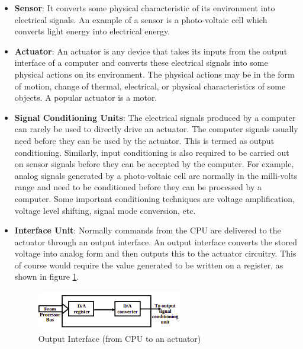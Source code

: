 \documentclass[12pt]{report}
\begin{document}
\begin{itemize}
    \item \textbf{Sensor}: It converts some physical characteristic of its environment into electrical signals. An example of a sensor is a photo-voltaic cell which converts light energy into electrical energy.
    \item \textbf{Actuator}: An actuator is any device that takes its inputs from the output interface of a computer and converts these electrical signals into some physical actions on its environment. The physical actions may be in the form of motion, change of thermal, electrical, or physical characteristics of some objects. A popular actuator is a motor.
    \item \textbf{Signal Conditioning Units}: The electrical signals produced by a computer can rarely be used to directly drive an actuator. The computer signals usually need before they can be used by the actuator. This is termed as output conditioning. Similarly, input conditioning is also required to be carried out on sensor signals before they can be accepted by the computer. For example, analog signals generated by a photo-voltaic cell are normally in the milli-volts range and need to be conditioned before they can be processed by a computer. Some important conditioning techniques are voltage amplification, voltage level shifting, signal mode conversion, etc. 
    \item \textbf{Interface Unit}: Normally commands from the CPU are delivered to the actuator through an output interface. An output interface converts the stored voltage into analog form and then outputs this to the actuator circuitry. This of course would require the value generated to be written on a register, as shown in figure \ref{fig:output}. 
    \begin{figure}[h]
    \centering
    \includegraphics[width=0.6\textwidth]{images/output-interface.png}
    \caption{Output Interface (from CPU to an actuator)}
    \label{fig:output}
    \end{figure}
\end{itemize}
\end{document}
